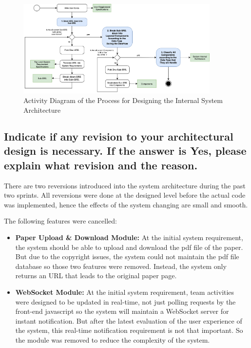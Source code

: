 \documentclass[conference]{IEEEtran}
\begin{document}
\begin{figure}[!ht]
	\centering
	\includegraphics[width=0.9\textwidth]{arch-process.png}
	\caption{Activity Diagram of the Process for Designing the Internal System Architecture}
	\label{fig:arch-process}
\end{figure}

\subsection{Indicate if any revision to your architectural design is necessary. If the answer is Yes, please explain what revision and the reason. }
\label{sec:1.2}

There are two reversions introduced into the system architecture during the past two sprints.
All reversions were done at the designed level before the actual code was implemented,
hence the effects of the system changing are small and smooth.

The following features were cancelled:

\begin{itemize}
	\item \textbf{Paper Upload \& Download Module:} At the initial system requirement, the system should be able to upload and download the pdf file of the paper.
	      But due to the copyright issues, the system could not maintain the pdf file database so those two features were removed.
	      Instead, the system only returns an URL that leads to the original paper page.
	\item \textbf{WebSocket Module:} At the initial system requirement, team activities were designed to be updated in real-time,
	      not just polling requests by the front-end javascript so the system will maintain a WebSocket server for instant notification.
	      But after the latest evaluation of the user experience of the system, this real-time notification requirement is not that important.
	      So the module was removed to reduce the complexity of the system.
\end{itemize}
\end{document}
